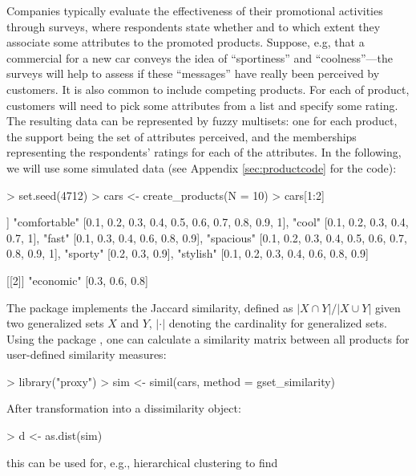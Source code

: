 \documentclass[article]{jss}
\newcommand{\dQuote}[1]{``{#1}''}
\begin{document}
Companies typically evaluate the effectiveness of their promotional
activities through surveys, where respondents state
whether and to which extent they associate some attributes to the
promoted products. Suppose, e.g, that a
commercial for a new car conveys the idea of \dQuote{sportiness} and
\dQuote{coolness}---the surveys will help to assess if
these \dQuote{messages} have really been perceived by
customers. It is also common to include competing products.
For each of product, customers will need to pick some attributes from
a list and specify some rating. The resulting data can be represented
by fuzzy multisets: one for each product, the support being the set of
attributes perceived, and the memberships representing the respondents'
ratings for each of the attributes. In the following, we will use some
simulated data (see Appendix \ref{sec:productcode} for the code):
\begin{Schunk}
\begin{Sinput}
> set.seed(4712)
> cars <- create_products(N = 10)
> cars[1:2]
\end{Sinput}
\begin{Soutput}
[[1]]
{"comfortable" [{0.1, 0.2, 0.3, 0.4, 0.5, 0.6, 0.7, 0.8, 0.9, 1}],
 "cool" [{0.1, 0.2, 0.3, 0.4, 0.7, 1}], "fast" [{0.1, 0.3, 0.4, 0.6,
 0.8, 0.9}], "spacious" [{0.1, 0.2, 0.3, 0.4, 0.5, 0.6, 0.7, 0.8, 0.9,
 1}], "sporty" [{0.2, 0.3, 0.9}], "stylish" [{0.1, 0.2, 0.3, 0.4, 0.6,
 0.8, 0.9}]}

[[2]]
{"economic" [{0.3, 0.6, 0.8}]}
\end{Soutput}
\end{Schunk}
The  package implements the
Jaccard similarity, defined as
$|X \cap Y| / |X \cup Y|$ given two generalized sets $X$ and $Y$, $|\cdot|$
denoting the cardinality for generalized sets.
Using the  package \citep{sets:meyer+buchta:2008},
one can calculate a similarity matrix between all products for
user-defined similarity measures:
\begin{Schunk}
\begin{Sinput}
> library("proxy")
> sim <- simil(cars, method = gset_similarity)
\end{Sinput}
\end{Schunk}
After transformation into a dissimilarity object:
\begin{Schunk}
\begin{Sinput}
> d <- as.dist(sim)
\end{Sinput}
\end{Schunk}
this can be used for, e.g., hierarchical clustering to find
\end{document}
